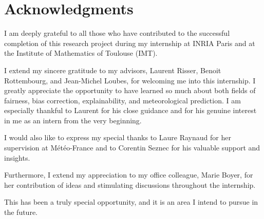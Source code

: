\section*{Acknowledgments}
I am deeply grateful to all those who have contributed to the successful completion of this research project during my internship at INRIA Paris and at the Institute of Mathematics of Toulouse (IMT).

I extend my sincere gratitude to my advisors, Laurent Risser, Benoit Rottembourg, and Jean-Michel Loubes, for welcoming me into this internship. I greatly appreciate the opportunity to have learned so much about both fields of fairness, bias correction, explainability, and meteorological prediction. I am especially thankful to Laurent for his close guidance and for his genuine interest in me as an intern from the very beginning.

I would also like to express my special thanks to Laure Raynaud for her supervision at Météo-France and to Corentin Seznec for his valuable support and insights.

Furthermore, I extend my appreciation to my office colleague, Marie Boyer, for her contribution of ideas and stimulating discussions throughout the internship.

This has been a truly special opportunity, and it is an area I intend to pursue in the future.
